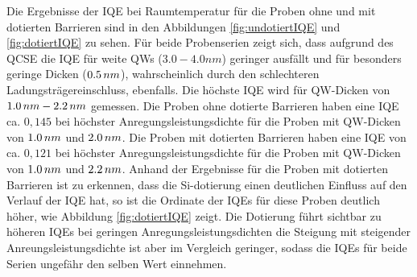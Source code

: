 \noindent 
% 
Die Ergebnisse der IQE bei Raumtemperatur für die Proben ohne und mit dotierten Barrieren sind in den Abbildungen 
\ref{fig:undotiertIQE} und \ref{fig:dotiertIQE} zu sehen. Für beide Probenserien zeigt sich, dass aufgrund des QCSE die IQE für weite QWs 
($3.0 -4.0  nm$) geringer ausfällt und für besonders geringe Dicken ($0.5\thinspace nm$), wahrscheinlich durch den schlechteren Ladungsträgereinschluss, ebenfalls. Die höchste IQE wird für QW-Dicken von $1.0 \thinspace nm- 2.2 \thinspace nm$ gemessen. Die Proben ohne dotierte Barrieren haben eine IQE ca. $0,145$ bei höchster Anregungsleistungsdichte für die Proben mit QW-Dicken von $1.0 \thinspace nm$ und $2.0\thinspace nm$. 
Die Proben mit dotierten Barrieren haben eine IQE von ca. $0,121$ bei höchster Anregungsleistungsdichte für die Proben mit QW-Dicken von $1.0 \thinspace nm$ und $2.2\thinspace nm$. Anhand der Ergebnisse für die Proben mit dotierten Barrieren ist zu erkennen, dass die Si-dotierung einen deutlichen Einfluss auf den Verlauf der IQE hat, so ist die Ordinate der IQEs für diese Proben deutlich höher, wie Abbildung \ref{fig:dotiertIQE} zeigt. Die Dotierung führt sichtbar zu höheren IQEs bei geringen Anregungsleistungsdichten die Steigung mit steigender Anreungsleistungsdichte ist aber im Vergleich geringer, sodass die IQEs für beide Serien ungefähr den selben Wert einnehmen.
%
